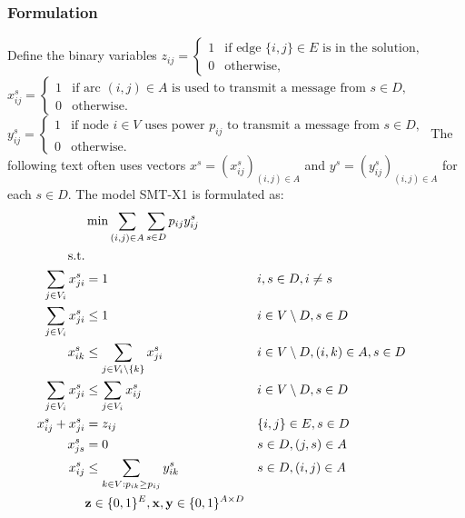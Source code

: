 \subsubsection{Formulation}
Define the binary variables
\newline\newline
  $z_{ij}=
	\begin{cases}
    1 & \text{if edge $\{i,j\} \in E$ is in the solution},\\
    0 & \text{otherwise},
  \end{cases}$
\newline\newline
  $x^{s}_{ij}=
	\begin{cases}
    1 & \text{if arc $(i,j) \in A$ is used to transmit a message from $s\in D$},\\
    0 & \text{otherwise}.
  \end{cases}$
  \newline\newline
  $y^s_{ij}=
	\begin{cases}
    1 & \text{if node $i \in V$ uses power $p_{ij}$ to transmit a message from $s\in D$},\\
    0 & \text{otherwise}.
  \end{cases}$
\newline
\newline    
The following text often uses vectors $x^s=(x^s_{ij})_{(i,j)\in A}$  and $y^s=(y^s_{ij})_{(i,j)\in A}$ for each $s\in D$. The model SMT-X1 is formulated as:
\begin{subequations}\label{eq:smt-x1}
\begin{flalign}
\label{objective:dd} &\makebox[0pt][l]{$\displaystyle{}\min \sum\limits_{(i,j) \in A} \sum\limits_{s \in D} p_{ij} y^s_{ij} $}  & &&\\ \notag  
\text{s.t.}&  &  &                 && \\	\
\label{con:dd:arrowFromDest} \sum\limits_{j\in V_i}x^s_{ji} & = 1 && i,s\in D,i\neq s && \\ 
\label{con:dd:arrowFromNonDestB} \sum\limits_{j\in V_{i}}x^s_{ji} & \leq 1 && i\in V \setminus D, s\in D   &&\\	
\label{con:dd:arrowFromNonDestA} x^s_{ik}  & \leq \sum\limits_{j\in V_{i}\setminus \{k\}}x^s_{ji} && i\in V \setminus D,(i,k)\in A, s\in D   &&\\	
\label{con:dd:extraCon} \sum\limits_{j\in V_{i}}x^s_{ji} & \leq \sum\limits_{j\in V_{i}}x^s_{ij} &&  	i\in V\setminus D, s\in D  &&\\	
\label{con:dd:oneDir} x^s_{ij} + x^s_{ji} & = z_{ij} && \{i,j\}\in E, s\in D &&\\
\label{con:dd:startInSource}  x^s_{js}    & = 0   &&  s\in D, (j,s)\in A &&\\		 
\label{con:dd:yvar} x^s_{ij} & \leq \sum\limits_{k\in V:p_{ik}\geq p_{ij}}y^s_{ik} && s\in D, (i,j)\in A &&\\  
& \label{con:dd:vardim}	\mathbf{z} \in \{0,1\}^{E}, \mathbf{x},\mathbf{y}\in \{0,1\}^{A\times D} &&	
\end{flalign}~
\end{subequations}  
